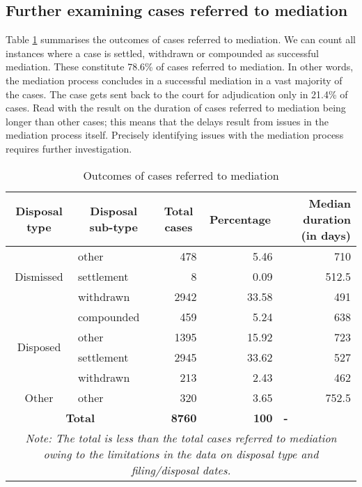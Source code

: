 \subsection{Further examining cases referred to mediation} \label{sec:furth-exam-cases}

Table \ref{tab:mediation} summarises the outcomes of cases referred to mediation. We can count all instances where a case is settled, withdrawn or compounded as successful mediation. These constitute 78.6\% of cases referred to mediation. In other words, the mediation process concludes in a successful mediation in a vast majority of the cases. The case gets sent back to the court for adjudication only in 21.4\% of cases. Read with the result on the duration of cases referred to mediation being longer than other cases; this means that the delays result from issues in the mediation process itself. Precisely identifying issues with the mediation process requires further investigation.

{\footnotesize \begin{longtable}{@{}clrrr@{}}
\caption{Outcomes of cases referred to mediation}
\label{tab:mediation}\\
\toprule
 \textbf{Disposal type} & \multicolumn{1}{c}{\textbf{Disposal sub-type}} & \multicolumn{1}{c}{\textbf{Total cases}} & \multicolumn{1}{c}{\textbf{Percentage}} & \multicolumn{1}{p{3cm}}{\textbf{Median duration (in days)}} \\
 \midrule
\endhead
\multirow{3}{*}{Dismissed} & other & 478 & 5.46 & 710 \\
 & settlement & 8 & 0.09 & 512.5 \\
 & withdrawn & 2942 & 33.58 & 491 \\
 \midrule
\multirow{4}{*}{Disposed} & compounded & 459 & 5.24 & 638 \\
 & other & 1395 & 15.92 & 723 \\
 & settlement & 2945 & 33.62 & 527 \\
 & withdrawn & 213 & 2.43 & 462 \\
 \midrule
 Other & other & 320 & 3.65 & 752.5 \\
 \midrule
 \multicolumn{2}{c}{\textbf{Total}} & \textbf{8760} & \textbf{100} & \multicolumn{1}{l}{\textbf{-}} \\
 \bottomrule
 \multicolumn{5}{p{11cm}}{{\footnotesize \emph{Note: The total is less than the total cases referred to mediation owing to the limitations in the data on disposal type and filing/disposal dates.}}}
\end{longtable}}

